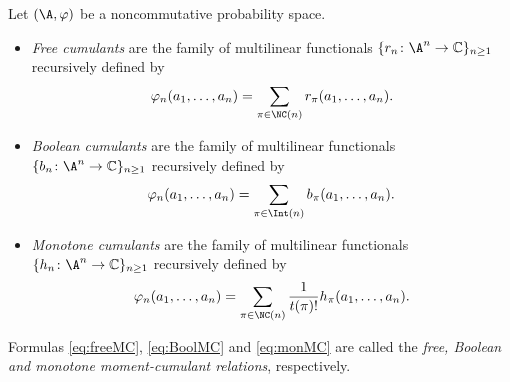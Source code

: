 \begin{Definition}
Let $(\A,\varphi)$ be a noncommutative probability space.
\begin{itemize}\itemsep=0pt
\item \textit{Free cumulants} are the family of multilinear functionals $\{r_n\colon \A^n\to\mathbb{C}\}_{n\geq1}$ recursively defined by~\cite{Spe94}
\begin{equation}\label{eq:freeMC}
\varphi_n(a_1,\dots,a_n) = \sum_{\pi\in \NC(n)} r_\pi(a_1,\dots,a_n).
\end{equation}
\item \textit{Boolean cumulants} are the family of multilinear functionals $\{b_n\colon \A^n\to\mathbb{C}\}_{n\geq1}$ recursively defined by~\cite{SW97}
\begin{equation}\label{eq:BoolMC}
\varphi_n(a_1,\dots,a_n) = \sum_{\pi\in \Int(n)} b_\pi(a_1,\dots,a_n).
\end{equation}
\item \textit{Monotone cumulants} are the family of multilinear functionals $\{h_n\colon \A^n\to\mathbb{C}\}_{n\geq1}$ recursively defined by~\cite{HS11b}
\begin{equation}\label{eq:monMC}
\varphi_n(a_1,\dots,a_n) = \sum_{\pi\in \NC(n)} \frac{1}{t(\pi)!} h_\pi(a_1,\dots,a_n).
\end{equation}
\end{itemize}

\end{Definition}
Formulas \eqref{eq:freeMC}, \eqref{eq:BoolMC} and \eqref{eq:monMC} are called the \textit{free, Boolean and monotone moment-cumulant relations}, respectively.

\if

\else

